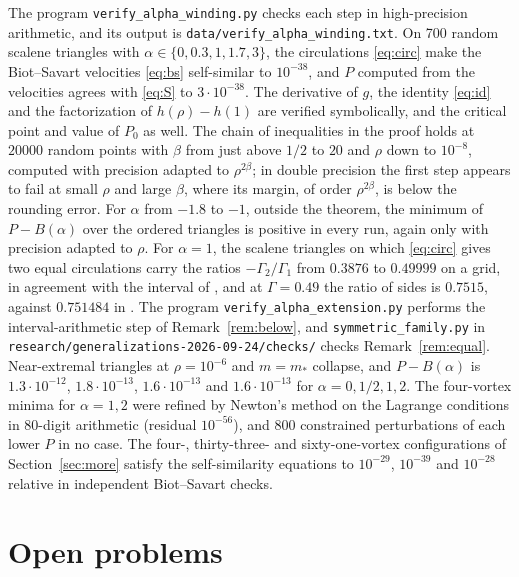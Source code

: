 \documentclass[11pt]{article}
\theoremstyle{definition}
\begin{document}
The program \texttt{verify\_alpha\_winding.py} checks each step in high-precision arithmetic, and its output is \texttt{data/verify\_alpha\_winding.txt}. On 700 random scalene triangles with $\alpha \in \{0, 0.3, 1, 1.7, 3\}$, the circulations \eqref{eq:circ} make the Biot--Savart velocities \eqref{eq:bs} self-similar to $10^{-38}$, and $P$ computed from the velocities agrees with \eqref{eq:S} to $3\cdot 10^{-38}$. The derivative of $g$, the identity \eqref{eq:id} and the factorization of $h(\rho) - h(1)$ are verified symbolically, and the critical point and value of $P_0$ as well. The chain of inequalities in the proof holds at $20000$ random points with $\beta$ from just above $1/2$ to $20$ and $\rho$ down to $10^{-8}$, computed with precision adapted to $\rho^{2\beta}$; in double precision the first step appears to fail at small $\rho$ and large $\beta$, where its margin, of order $\rho^{2\beta}$, is below the rounding error. For $\alpha$ from $-1.8$ to $-1$, outside the theorem, the minimum of $P - B(\alpha)$ over the ordered triangles is positive in every run, again only with precision adapted to $\rho$. For $\alpha = 1$, the scalene triangles on which \eqref{eq:circ} gives two equal circulations carry the ratios $-\Gamma_2/\Gamma_1$ from $0.3876$ to $0.49999$ on a grid, in agreement with the interval of \cite[Lemma~1]{bb2018}, and at $\Gamma = 0.49$ the ratio of sides is $0.7515$, against $0.751484$ in \cite{bb2018}. The program \texttt{verify\_alpha\_extension.py} performs the interval-arithmetic step of Remark~\ref{rem:below}, and \texttt{symmetric\_family.py} in \texttt{research/generalizations-2026-09-24/checks/} checks Remark~\ref{rem:equal}. Near-extremal triangles at $\rho = 10^{-6}$ and $m = m_*$ collapse, and $P - B(\alpha)$ is $1.3\cdot 10^{-12}$, $1.8\cdot 10^{-13}$, $1.6\cdot 10^{-13}$ and $1.6\cdot 10^{-13}$ for $\alpha = 0, 1/2, 1, 2$. The four-vortex minima for $\alpha = 1, 2$ were refined by Newton's method on the Lagrange conditions in 80-digit arithmetic (residual $10^{-56}$), and 800 constrained perturbations of each lower $P$ in no case. The four-, thirty-three- and sixty-one-vortex configurations of Section~\ref{sec:more} satisfy the self-similarity equations to $10^{-29}$, $10^{-39}$ and $10^{-28}$ relative in independent Biot--Savart checks.

\section{Open problems}
\end{document}

